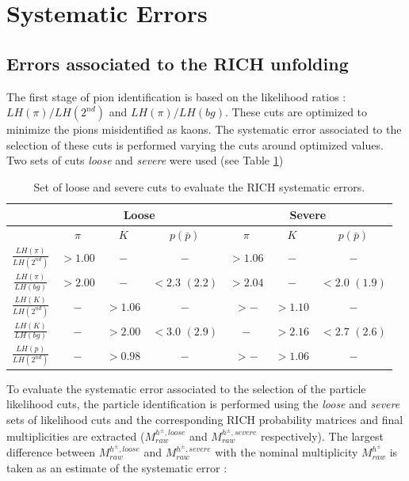 \documentclass[letterpaper,12pt]{article}
\begin{document}
\section{Systematic Errors} \label{Sys}

\subsection{Errors associated to the RICH unfolding}

The first stage of pion identification is based on the likelihood ratios : $LH(\pi)/LH(2^{nd})$ and $LH(\pi)/LH(bg)$. These cuts are optimized to minimize the
pions misidentified as kaons. The systematic error associated to the selection of these cuts is performed varying the cuts around optimized values. Two sets of
cuts \textit{loose} and \textit{severe} were used (see Table \ref{loose.severe})

\begin{table}[!h]
	\centering
	\begin{tabular}{ccccccc}
		\hline
		 & \multicolumn{3}{c}{Loose} & \multicolumn{3}{c}{Severe} \\
		\hline
		 & $\pi$ & $K$ & $p(\bar{p})$ & $\pi$ & $K$ & $p(\bar{p})$ \\
		\hline
		$\frac{LH(\pi)}{LH(2^{nd})}$ & $> 1.00$ & $-$ & $-$ & $>1.06$ & $-$ & $-$ \\
		$\frac{LH(\pi)}{LH(bg)}$ & $> 2.00$ & $-$ & $<2.3$ $(2.2)$ & $>2.04$ & $-$ & $<2.0$ $(1.9)$ \\
		$\frac{LH(K)}{LH(2^{nd})}$ & $-$ & $>1.06$ & $-$ & $>-$ & $>1.10$ & $-$ \\
		$\frac{LH(K)}{LH(bg)}$ & $-$ & $>2.00$ & $<3.0$ $(2.9)$ & $-$ & $>2.16$ & $<2.7$ $(2.6)$ \\
		$\frac{LH(p)}{LH(2^{nd})}$ & $-$ & $>0.98$ & $-$ & $>-$ & $>1.06$ & $-$ \\
		\hline
	\end{tabular}
  \caption{Set of loose and severe cuts to evaluate the RICH systematic errors.}
  \label{loose.severe}
\end{table}

To evaluate the systematic error associated to the selection of the particle likelihood cuts, the particle identification is performed using the \textit{loose}
and \textit{severe} sets of likelihood cuts and the corresponding RICH probability matrices and final multiplicities are extracted ($M^{h^{\pm},loose}_{raw}$
and $M^{h^{\pm},severe}_{raw}$ respectively). The largest difference between $M^{h^{\pm},loose}_{raw}$ and $M^{h^{\pm},severe}_{raw}$ with the nominal
multiplicity $M^{h^{\pm}}_{raw}$ is taken as an estimate of the systematic error :
\end{document}
